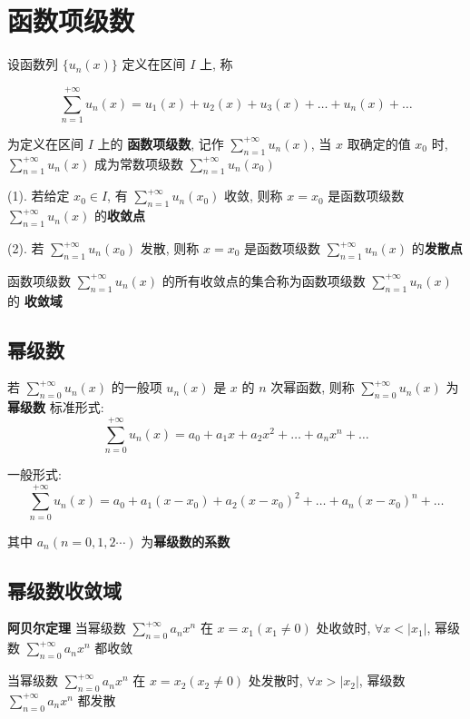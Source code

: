\section{函数项级数}
\begin{definition}[函数项级数]
	设函数列 $\{u_{n}(x)\}$ 定义在区间 $I$ 上, 称 
	
	$$\sum\limits_{n=1}^{+\infty}u_{n}(x)=u_{1}(x)+u_{2}(x)+u_{3}(x)+\dots+u_{n}(x)+\dots$$
	
	为定义在区间 $I$ 上的 \textbf{函数项级数}, 记作 $\sum\limits_{n=1}^{+\infty}u_{n}(x)$, 当 $x$ 取确定的值 $x_{0}$ 时, 
	$\sum\limits_{n=1}^{+\infty}u_{n}(x)$ 成为常数项级数 $\sum\limits_{n=1}^{+\infty}u_{n}(x_{0})$
\end{definition}
\begin{definition}[收敛点和发散点]
	(1). 若给定 $x_{0}\in I$, 有 $\sum\limits_{n=1}^{+\infty}u_{n}(x_{0})$ 收敛, 
	则称 $x=x_{0}$ 是函数项级数 $\sum\limits_{n=1}^{+\infty}u_{n}(x)$ 的\textbf{收敛点}

	(2). 若 $\sum\limits_{n=1}^{+\infty}u_{n}(x_{0})$ 发散, 则称  $x = x_{0}$ 是函数项级数 $\sum\limits_{n=1}^{+\infty}u_{n}(x)$ 的\textbf{发散点}
\end{definition}

\begin{definition}[收敛域]
	函数项级数 $\sum\limits_{n=1}^{+\infty}u_{n}(x)$ 的所有收敛点的集合称为函数项级数 $\sum\limits_{n=1}^{+\infty}u_{n}(x)$ 的 \textbf{收敛域}
\end{definition}
\subsection{幂级数}

\begin{definition}[幂级数]
	若 $\sum\limits_{n=0}^{+\infty}u_{n}(x)$ 的一般项 $u_{n}(x)$ 是 $x$ 的 $n$ 次幂函数, 
	则称 $\sum\limits_{n=0}^{+\infty}u_{n}(x)$ 为\textbf{幂级数}
	标准形式:
	$$\sum\limits_{n=0}^{+\infty}u_{n}(x)=a_{0}+a_{1}x+a_{2}x^{2}+\dots+a_{n}x^{n}+\dots$$
	
	一般形式:
	$$\sum\limits_{n=0}^{+\infty}u_{n}(x)=a_{0}+a_{1}(x-x_{0})+a_{2}(x-x_{0})^{2}+\dots+a_{n}(x-x_{0})^{n}+\dots$$

	其中 $a_{n}(n=0,1,2\cdots)$ 为\textbf{幂级数的系数}  
\end{definition}

\subsection{幂级数收敛域}
\begin{theorem}[阿贝尔定理]
	\textbf{阿贝尔定理}
	当幂级数 $\sum\limits_{n=0}^{+\infty}a_{n}x^{n}$ 在 $x=x_{1}(x_{1}\neq 0)$ 处收敛时, $\forall x < |x_{1}|$, 幂级数 $\sum\limits_{n=0}^{+\infty}a_{n}x^{n}$ 都收敛

	当幂级数 $\sum\limits_{n=0}^{+\infty}a_{n}x^{n}$ 在 $x=x_{2}(x_{2}\neq 0)$ 处发散时, $\forall x > |x_{2}|$, 幂级数 $\sum\limits_{n=0}^{+\infty}a_{n}x^{n}$ 都发散
\end{theorem}

